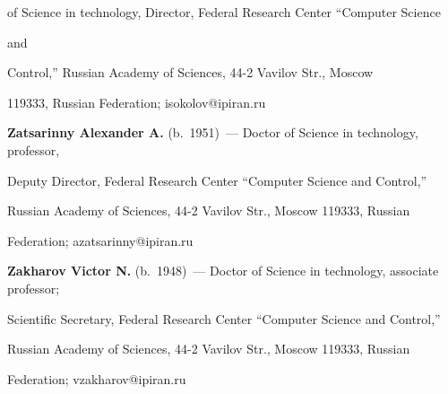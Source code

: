 of Science in technology, Director, Federal Research Center ``Computer Science


and


Control,'' Russian Academy of Sciences, 44-2 Vavilov Str., Moscow


119333, Russian Federation; isokolov@ipiran.ru





\vspace*{3pt}





\noindent


\textbf{Zatsarinny Alexander A.} (b.\ 1951)~--- Doctor of Science in technology, professor,


Deputy Director, Federal Research Center ``Computer Science and Control,''


Russian Academy of Sciences, 44-2 Vavilov Str., Moscow 119333, Russian


Federation; azatsarinny@ipiran.ru








\vspace*{3pt}





\noindent


\textbf{Zakharov Victor N.} (b.\ 1948)~--- Doctor of Science in technology, associate professor;


Scientific Secretary, Federal Research Center ``Computer Science and Control,''


Russian Academy of Sciences, 44-2 Vavilov Str., Moscow 119333, Russian


Federation; vzakharov@ipiran.ru





 \label{end\stat}








\renewcommand{\bibname}{\protect\rm Литература}











